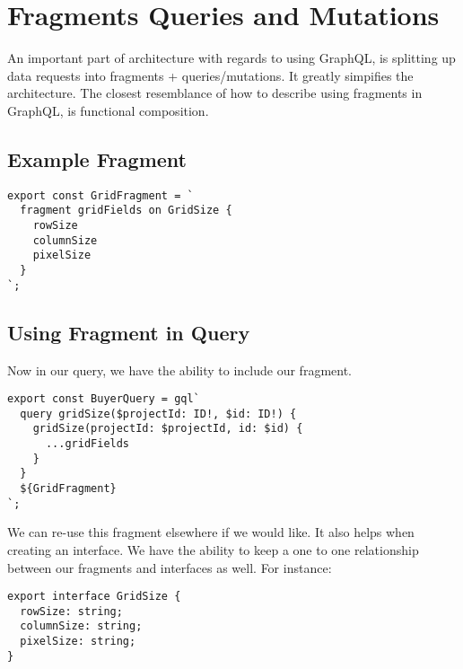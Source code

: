 \maketitle{}
\section{ Fragments Queries and Mutations }

An important part of architecture with regards to using GraphQL, is splitting
up data requests into fragments + queries/mutations. It greatly simpifies
the architecture. The closest resemblance of how to describe using fragments
in GraphQL, is functional composition.


\maketitle{}
\subsection{ Example Fragment }
\begin{verbatim}
export const GridFragment = `
  fragment gridFields on GridSize {
    rowSize
    columnSize
    pixelSize
  }
`;
\end{verbatim}

\subsection{ Using Fragment in Query }
Now in our query, we have the ability to include our fragment.
\begin{verbatim}
export const BuyerQuery = gql`
  query gridSize($projectId: ID!, $id: ID!) {
    gridSize(projectId: $projectId, id: $id) {
      ...gridFields
    }
  }
  ${GridFragment}
`;
\end{verbatim}

We can re-use this fragment elsewhere if we would like. It also helps when
creating an interface. We have the ability to keep a one to one relationship
between our fragments and interfaces as well. For instance:
\begin{lstlisting}
export interface GridSize {
  rowSize: string;
  columnSize: string;
  pixelSize: string;
}
\end{lstlisting}
